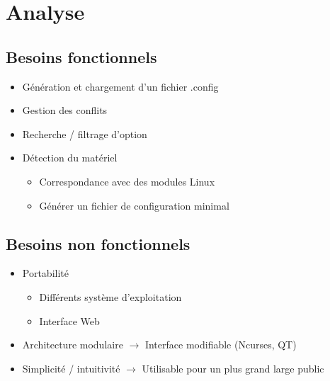 \documentclass[11pt]{beamer}
\begin{document}
\section{Analyse}
\subsection{Besoins fonctionnels}
\begin{frame}
    \begin{itemize}
        \setlength{\itemsep}{20pt}
        \item Génération et chargement d'un fichier .config
        \item Gestion des conflits
        \item Recherche / filtrage d'option
        \item Détection du matériel
            \begin{itemize}
                \item Correspondance avec des modules Linux
                \item Générer un fichier de configuration minimal
            \end{itemize}
    \end{itemize}
\end{frame}


\subsection{Besoins non fonctionnels}
\begin{frame}
    \begin{itemize}
        \setlength{\itemsep}{20pt}
        \item Portabilité
            \begin{itemize}
                \item Différents système d'exploitation
                \item Interface Web
            \end{itemize}
        \item Architecture modulaire $\rightarrow$ Interface modifiable (Ncurses, QT)
        \item Simplicité / intuitivité $\rightarrow$ Utilisable pour un plus grand large public
    \end{itemize}
\end{frame}
\end{document}
